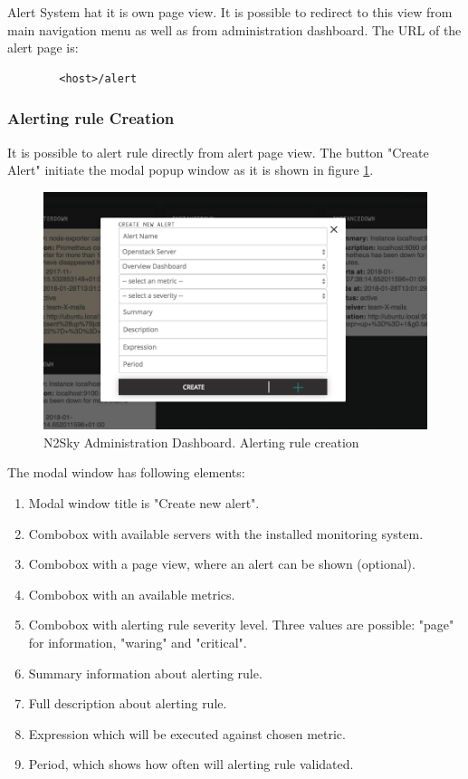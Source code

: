Alert System hat it is own page view. It is possible to redirect to this view from main navigation menu as well as from administration dashboard. The URL of the alert page is:
\begin{lstlisting}
        <host>/alert
\end{lstlisting}

\subsubsection{Alerting rule Creation}\label{Alerting rule creation}

It is possible to alert rule directly from alert page view. The button "Create Alert" initiate the modal popup window as it is shown in figure \ref{fig:alert_create}.

\begin{figure}[H]
\begin{center}
  \includegraphics[width=\linewidth]{components/4/pics/alert_create.png}
  \caption{N2Sky Administration Dashboard. Alerting rule creation}
  \label{fig:alert_create}
\end{center}
\end{figure}

The modal window has following elements:
\begin{enumerate}
\item Modal window title is "Create new alert".
\item Combobox with available servers with the installed monitoring system.
\item Combobox with a page view, where an alert can be shown (optional).
\item Combobox with an available metrics.
\item Combobox with alerting rule severity level. Three values are possible: "page" for information, "waring" and "critical".
\item Summary information about alerting rule.
\item Full description about alerting rule.
\item Expression which will be executed against chosen metric.
\item Period, which shows how often will alerting rule validated.
\end{enumerate}



